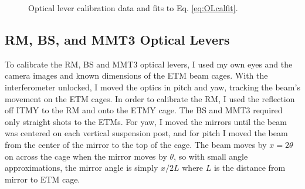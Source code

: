 \begin{figure}
\begin{centering}
\caption[Optical lever calibration data.]{Optical lever calibration data and
  fits to Eq. \ref{eq:OLcalfit}.}
\label{fig:OLcal}
\end{centering}
\end{figure}


\subsection{RM, BS, and MMT3 Optical Levers}
To calibrate the RM, BS and MMT3 optical levers, I used my own eyes
and the camera images and known dimensions of the ETM beam cages. With
the interferometer unlocked, I moved the optics in pitch and yaw,
tracking the beam's movement on the ETM cages. In order to calibrate
the RM, I used the reflection off ITMY to the RM and onto the ETMY
cage. The BS and MMT3 required only straight shots to the ETMs. For
yaw, I moved the mirrors until the beam was centered on each vertical
suspension post, and for pitch I moved the beam from the center of the
mirror to the top of the cage. The beam moves by $x = 2\theta$ on
across the cage when the mirror moves by $\theta$, so with small angle
approximations, the mirror angle is simply $x/2L$ where $L$ is the
distance from mirror to ETM cage.

